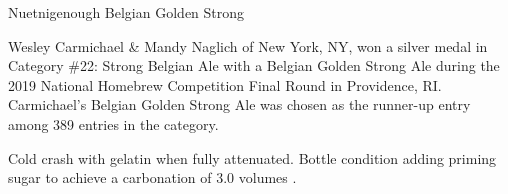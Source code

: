 \stylesection{\stylebelgiangoldenstrongale}

\begin{recipie}{Nuetnigenough Belgian Golden Strong}

\begin{aboutblock}
Wesley Carmichael \& Mandy Naglich of New York, NY, won a silver medal in
Category \#22: Strong Belgian Ale with a Belgian Golden Strong Ale during the
2019 National Homebrew Competition Final Round in Providence, RI. Carmichael's
Belgian Golden Strong Ale was chosen as the runner-up entry among 389 entries
in the category.
\end{aboutblock}


\begin{methodandtiming}
 
\begin{mashsteps}
\end{mashsteps}

\begin{fermentationsteps}
\end{fermentationsteps}

\begin{directions}
Cold crash with gelatin when fully attenuated. Bottle condition adding priming
sugar to achieve a carbonation of 3.0 volumes .
\end{directions}

\end{methodandtiming}

\pagebreak

\begin{ingredientsblock}

\begin{malts}
\end{malts}

\begin{hops}
\end{hops}

\begin{yeasts}
\end{yeasts}

\end{ingredientsblock}

\end{recipie}
